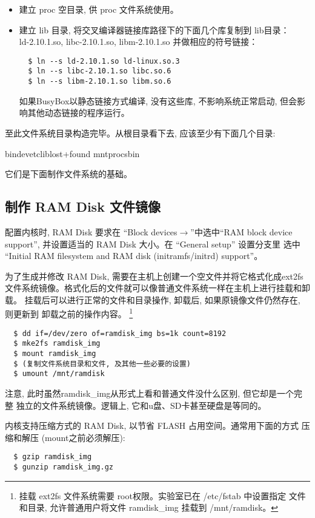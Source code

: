 \begin{itemize}
  \item 建立 proc 空目录, 供 proc 文件系统使用。
  \item 建立 lib 目录, 将交叉编译器链接库路径下的下面几个库复制到 lib目录：\\
      ld-2.10.1.so, libc-2.10.1.so, libm-2.10.1.so 并做相应的符号链接：\\
\begin{verbatim}
  $ ln --s ld-2.10.1.so ld-linux.so.3
  $ ln --s libc-2.10.1.so libc.so.6
  $ ln --s libm-2.10.1.so libm.so.6
\end{verbatim}
        如果BusyBox以静态链接方式编译, 没有这些库, 不影响系统正常启动, 
        但会影响其他动态链接的程序运行。
\end{itemize}

至此文件系统目录构造完毕。从根目录看下去, 应该至少有下面几个目录:

bin\qquad  dev\qquad  etc\qquad  lib\qquad lost+found\qquad
mnt\qquad proc\qquad sbin

它们是下面制作文件系统的基础。

\subsection{制作 RAM Disk 文件镜像}
配置内核时, RAM Disk 要求在 ``Block devices$\to$''中选中``RAM block
device support'', 并设置适当的 RAM Disk 大小。在 ``General setup'' 设置分支里
选中 ``Initial RAM filesystem and RAM disk (initramfs/initrd) support''。

为了生成并修改 RAM Disk, 需要在主机上创建一个空文件并将它格式化成ext2fs
文件系统镜像。格式化后的文件就可以像普通文件系统一样在主机上进行挂载和卸载。
挂载后可以进行正常的文件和目录操作, 卸载后, 如果原镜像文件仍然存在, 则更新到
卸载之前的操作内容。
\footnote{ 挂载 ext2fs 文件系统需要 root权限。实验室已在 /etc/fstab 中设置指定
文件和目录, 允许普通用户将文件 ramdisk\_img 挂载到 /mnt/ramdisk。}
\begin{verbatim}
  $ dd if=/dev/zero of=ramdisk_img bs=1k count=8192
  $ mke2fs ramdisk_img
  $ mount ramdisk_img
  $ (复制文件系统目录和文件, 及其他一些必要的设置)
  $ umount /mnt/ramdisk
\end{verbatim}

注意, 此时虽然ramdisk\_img从形式上看和普通文件没什么区别, 但它却是一个完整
独立的文件系统镜像。逻辑上, 它和u盘、SD卡甚至硬盘是等同的。

内核支持压缩方式的 RAM Disk, 以节省 FLASH 占用空间。通常用下面的方式
压缩和解压 (mount之前必须解压):
\begin{verbatim}
  $ gzip ramdisk_img
  $ gunzip ramdisk_img.gz
\end{verbatim}


